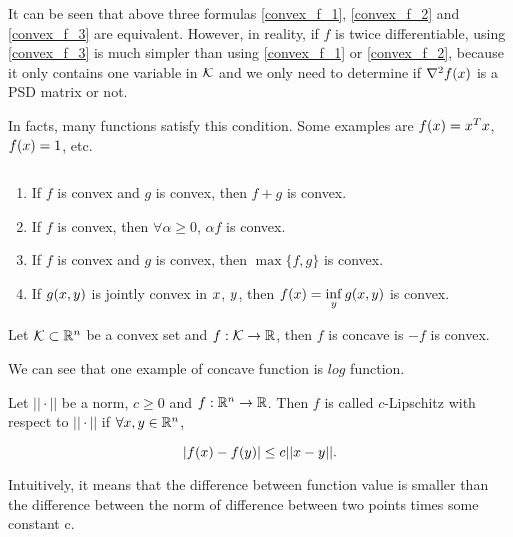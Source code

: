\documentclass[../main.tex]{subfiles}
\begin{document}
\begin{remark}
	 It can be seen that above three formulas \eqref{convex_f_1}, \eqref{convex_f_2} and \eqref{convex_f_3} are equivalent. However, in reality, if $f$ is twice differentiable, using \eqref{convex_f_3} is much simpler than using \eqref{convex_f_1} or \eqref{convex_f_2}, because it only contains one variable in $\mathcal{K}$ and we only need to determine if $\nabla^2f(x)$ is a PSD matrix or not.
	 
	   In facts, many functions satisfy this condition. Some examples are $f(x) = x^T x$, $f(x) = 1$, etc.
\end{remark}


\begin{proposition} $\quad$ 
	\begin{enumerate}
		\item If $f$ is convex and $g$ is convex, then $f + g$ is convex.
		\item If $f$ is convex, then $\forall \alpha \geq 0 $, $\alpha f$ is convex.
		\item If $f$ is convex and $g$ is convex, then $\max\{f,g\}$ is convex.
		\item If $g(x, y)$ is jointly convex in $x$, $y$, then $f(x) = \inf\limits_{y} g(x, y)$ is convex.
	\end{enumerate}
\end{proposition}

\begin{definition}
	Let $\mathcal{K} \subset  \mathbb{R}^n $ be a convex set and $f:\mathcal{K} \to \mathbb{R}$, then $f$ is concave is $-f$ is convex.
\end{definition}

We can see that one example of concave function is $log$ function.


\begin{definition}
	Let $||\cdot||$ be a norm, $c \geq 0$ and $f:\mathbb{R}^n \to \mathbb{R}$. Then $f$ is called $c$-Lipschitz with respect to $||\cdot||$ if $\forall x, y \in \mathbb{R}^n$, 
	
	\begin{equation}
		|f(x) - f(y)| \leq c||x - y||.
	\end{equation}
	
	Intuitively, it means that the difference between function value is smaller than the difference between the norm of difference between two points times some constant c.
\end{definition}
\end{document}
